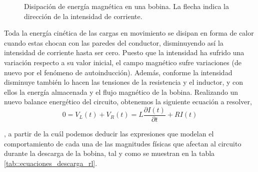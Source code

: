 \documentclass[../main.tex]{subfiles}
\begin{document}
 \begin{figure}[!h]
    \centering
    \caption{Disipación de energía magnética en una bobina. La flecha indica la dirección de la intensidad de corriente.}
    \label{fig::carga_bobina}
\end{figure}

Toda la energía cinética de las cargas en movimiento se disipan en forma de calor cuando estas chocan con las paredes del conductor, disminuyendo así la intensidad de corriente hasta ser cero. Puesto que la intensidad ha sufrido una variación respecto a su valor inicial, el campo magnético sufre variaciones (de nuevo por el fenómeno de autoinducción). Además, conforme la intensidad disminuye también lo hacen las tensiones de la resistencia y el inductor, y con ellos la energía almacenada y el flujo magnético de la bobina. Realizando un nuevo balance energético del circuito, obtenemos la siguiente ecuación a resolver, 
\begin{equation}
    \label{eqq::descarga_bobina}
    0 = V_L(t) + V_R(t) = L \frac{\partial I(t)}{\partial t} + R I(t)
\end{equation}

, a partir de la cuál podemos deducir las expresiones que modelan el comportamiento de cada una de las magnitudes físicas que afectan al circuito durante la descarga de la bobina, tal y como se muestran en la tabla \ref{tab::ecuaciones_descarga_rl}.\\
\end{document}
